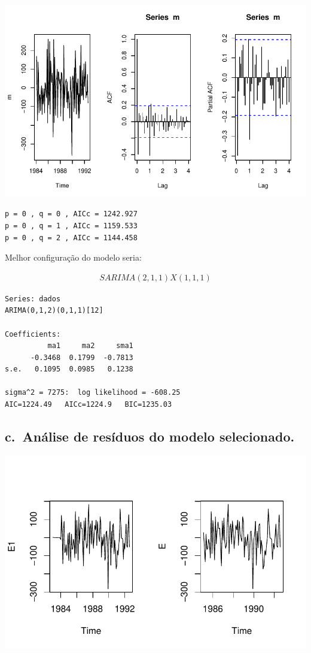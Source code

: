 \documentclass[
  letterpaper,
  DIV=11,
  numbers=noendperiod]{scrartcl}
\begin{document}
\includegraphics{Trabalhao1_ST_grupo5res_files/figure-pdf/unnamed-chunk-7-1.pdf}

\begin{verbatim}
p = 0 , q = 0 , AICc = 1242.927 
p = 0 , q = 1 , AICc = 1159.533 
p = 0 , q = 2 , AICc = 1144.458 
\end{verbatim}

Melhor configuração do modelo seria:

\begin{align*}
  SARIMA (2, 1, 1) X (1, 1, 1)
\end{align*}

\begin{verbatim}
Series: dados 
ARIMA(0,1,2)(0,1,1)[12] 

Coefficients:
          ma1     ma2     sma1
      -0.3468  0.1799  -0.7813
s.e.   0.1095  0.0985   0.1238

sigma^2 = 7275:  log likelihood = -608.25
AIC=1224.49   AICc=1224.9   BIC=1235.03
\end{verbatim}

\hypertarget{c.-anuxe1lise-de-resuxedduos-do-modelo-selecionado.}{%
\subsection{c.~Análise de resíduos do modelo
selecionado.}\label{c.-anuxe1lise-de-resuxedduos-do-modelo-selecionado.}}

\includegraphics{Trabalhao1_ST_grupo5res_files/figure-pdf/unnamed-chunk-10-1.pdf}
\end{document}
